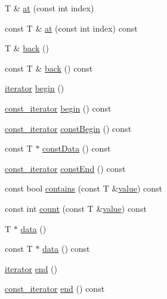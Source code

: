 \begin{DoxyCompactItemize}
T \& \hyperlink{classprism_1_1_array_a38eee56b6b29542cc8fc809bcdf88adc}{at} (const int index)
\item 
const T \& \hyperlink{classprism_1_1_array_a5ea8ce39540e7a18dcfe3057eff40f66}{at} (const int index) const 
\item 
T \& \hyperlink{classprism_1_1_array_aa98c1726b4d71648e2ca593837c4dc4a}{back} ()
\item 
const T \& \hyperlink{classprism_1_1_array_a205c800e2f974616f682b5d8f5f07926}{back} () const 
\item 
\hyperlink{classprism_1_1_array_acf99b1f921727cf61cf9d5b66acc66b8}{iterator} \hyperlink{classprism_1_1_array_a68c79391a86abea8d2d756f9cef6ceb5}{begin} ()
\item 
\hyperlink{classprism_1_1_array_a1654729fe986281be9c0064999caf3d7}{const\+\_\+iterator} \hyperlink{classprism_1_1_array_aea8c7e7aaeef5e9de7ad0609c3df60c8}{begin} () const 
\item 
\hyperlink{classprism_1_1_array_a1654729fe986281be9c0064999caf3d7}{const\+\_\+iterator} \hyperlink{classprism_1_1_array_af8365be504a6fc5067b7faa35422f5e0}{const\+Begin} () const 
\item 
const T $\ast$ \hyperlink{classprism_1_1_array_a02182d46b5dae8319de11a30041a670f}{const\+Data} () const 
\item 
\hyperlink{classprism_1_1_array_a1654729fe986281be9c0064999caf3d7}{const\+\_\+iterator} \hyperlink{classprism_1_1_array_a01c0540cbafb06cc4bca50f17b76235e}{const\+End} () const 
\item 
const bool \hyperlink{classprism_1_1_array_ab1dbaaa25fdd52114ecf83764d07dd32}{contains} (const T \&\hyperlink{classprism_1_1_array_a2c5690996975510eed7112066b936d8f}{value}) const 
\item 
const int \hyperlink{classprism_1_1_array_a17090694f8652c186aef26882a387c05}{count} (const T \&\hyperlink{classprism_1_1_array_a2c5690996975510eed7112066b936d8f}{value}) const 
\item 
T $\ast$ \hyperlink{classprism_1_1_array_a32ac66258d8a1c8e7d89d87ae4276bdc}{data} ()
\item 
const T $\ast$ \hyperlink{classprism_1_1_array_abe5c375e7b01f51c1c3bc1f95268428a}{data} () const 
\item 
\hyperlink{classprism_1_1_array_acf99b1f921727cf61cf9d5b66acc66b8}{iterator} \hyperlink{classprism_1_1_array_aeadc3ca6d7ea12af461b5c6a7fcedd47}{end} ()
\item 
\hyperlink{classprism_1_1_array_a1654729fe986281be9c0064999caf3d7}{const\+\_\+iterator} \hyperlink{classprism_1_1_array_a44f1f427aefb6f98f5e45efc1d78b4ae}{end} () const 

\end{DoxyCompactItemize}
